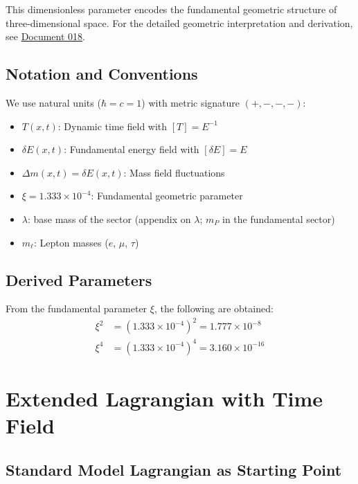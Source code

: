 	This dimensionless parameter encodes the fundamental geometric structure of three-dimensional space. For the detailed geometric interpretation and derivation, see \href{https://github.com/jpascher/T0-Time-Mass-Duality/blob/main/2/pdf/018_T0_Anomale-g2-10_De.pdf}{Document 018}.
	
	\subsection{Notation and Conventions}
	
	We use natural units ($\hbar = c = 1$) with metric signature $(+,-,-,-)$:
	
	\begin{itemize}
		\item $T(x,t)$: Dynamic time field with $[T] = E^{-1}$
		\item $\delta E(x,t)$: Fundamental energy field with $[\delta E] = E$
		\item $\Delta m(x,t) = \delta E(x,t)$: Mass field fluctuations
		\item $\xi = 1.333 \times 10^{-4}$: Fundamental geometric parameter
		\item $\lambda$: base mass of the sector (appendix on $\lambda$; $m_P$ in the fundamental sector)
		\item $m_\ell$: Lepton masses ($e$, $\mu$, $\tau$)
	\end{itemize}
	
	\subsection{Derived Parameters}
	
	From the fundamental parameter $\xi$, the following are obtained:
	\begin{align}
		\xi^2 &= \left(1.333 \times 10^{-4}\right)^2 = 1.777 \times 10^{-8} \label{eq:xi_squared} \\
		\xi^4 &= \left(1.333 \times 10^{-4}\right)^4 = 3.160 \times 10^{-16} \label{eq:xi_fourth}
	\end{align}
	
	\section{Extended Lagrangian with Time Field}
	
	\subsection{Standard Model Lagrangian as Starting Point}
	
